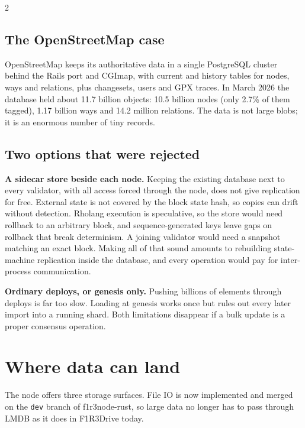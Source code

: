 \documentclass[10pt]{article}
\begin{document}
\begin{multicols}{2}
\subsection{The OpenStreetMap case}

OpenStreetMap keeps its authoritative data in a single PostgreSQL cluster behind
the Rails port and CGImap, with current and history tables for nodes, ways and
relations, plus changesets, users and GPX traces. In March 2026 the database held
about 11.7 billion objects: 10.5 billion nodes (only 2.7\% of them tagged),
1.17 billion ways and 14.2 million relations. The data is not large blobs; it is
an enormous number of tiny records.

\subsection{Two options that were rejected}

\textbf{A sidecar store beside each node.} Keeping the existing database next to
every validator, with all access forced through the node, does not give
replication for free. External state is not covered by the block state hash, so
copies can drift without detection. Rholang execution is speculative, so the
store would need rollback to an arbitrary block, and sequence-generated keys leave
gaps on rollback that break determinism. A joining validator would need a
snapshot matching an exact block. Making all of that sound amounts to rebuilding
state-machine replication inside the database, and every operation would pay for
inter-process communication.

\textbf{Ordinary deploys, or genesis only.} Pushing billions of elements through
deploys is far too slow. Loading at genesis works once but rules out every later
import into a running shard. Both limitations disappear if a bulk update is a
proper consensus operation.

\section{Where data can land}

The node offers three storage surfaces. File IO is now implemented and merged on
the \texttt{dev} branch of f1r3node-rust, so large data no longer has to pass
through LMDB as it does in F1R3Drive today.


\end{multicols}
\end{document}
